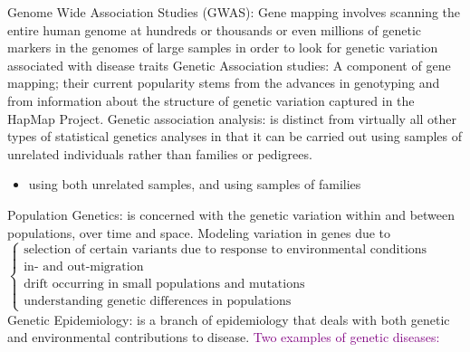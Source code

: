 \documentclass[a4paper,twoside,11pt]{article}
\begin{document}
\textcolor{NavyBlue}{Genome Wide Association Studies (GWAS): }Gene mapping involves scanning the entire human genome at hundreds or thousands or even millions of genetic markers in the genomes of large samples in order to look for genetic variation associated with disease traits
\newline
\newline
\textcolor{NavyBlue}{Genetic Association studies: }A component of gene mapping; their current popularity stems from the advances in genotyping and from information about the structure of genetic variation captured in the HapMap Project. 
\newline
\newline
\textcolor{NavyBlue}{Genetic association analysis: }is distinct from virtually all other types of statistical genetics analyses in that it can be carried out using samples of unrelated individuals rather than families or pedigrees.
\begin{itemize}
    \item using both unrelated samples, and using samples of families
\end{itemize}
\textcolor{NavyBlue}{Population Genetics: }is concerned with the genetic variation within and between populations, over time and space. 
\newline
\newline
Modeling variation in genes due to $\begin{cases}
\text{selection of certain variants due to response to environmental conditions} \\
\text{in- and out-migration} \\
\text{drift occurring in small populations and mutations} \\ 
\text{understanding genetic differences in populations}
\end{cases}$
\newline
\newline
\textcolor{NavyBlue}{Genetic Epidemiology: }is a branch of epidemiology that deals with both genetic and environmental contributions to disease. 
\newline
\newline
\textcolor{Purple}{Two examples of genetic diseases: }
\newline
\end{document}
